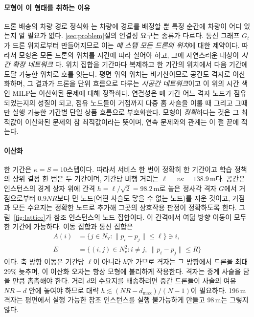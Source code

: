 \documentclass[final,5p,times,twocolumn]{elsarticle}
\begin{document}
\paragraph{모형이 이 형태를 취하는 이유}
드론 배송의 차량 경로 정식화 \cite{murray2015,agatz2018}는 차량에 경로를 배정할 뿐 특정 순간에
차량이 어디 있는지 알 필요가 없다. \ref{sec:problem}절의 연결성 요구는 종류가 다르다. 통신 그래프
$G_t$가 드론 위치로부터 만들어지므로 이는 \emph{매 스텝 모든 드론의 위치}에 대한 제약이다. 따라서
모형은 모든 드론의 위치를 시간에 따라 실어야 하고, 그에 자연스러운 대상이 \emph{시간 확장 네트워크}
\cite{ford1962}다. 위치 집합을 기간마다 복제하고 한 기간의 위치에서 다음 기간에 도달 가능한
위치로 호를 잇는다. 평면 위의 위치는 비가산이므로 공간도 격자로 이산화하며, 그 결과가 드론을 단위
흐름으로 다루는 \emph{시공간 네트워크}이고 이 위의 시간 색인 MILP는 이산화된 문제에 대해 정확하다.
연결성은 매 기간 어느 격자 노드가 점유되었는지의 성질이 되고, 점유 노드들이 거점까지 다중 홉 사슬을
이룰 때 그리고 그때만 실행 가능한 기간별 단일 상품 흐름으로 부호화한다. 모형이 \emph{정확}하다는 것은
그 최적값이 이산화된 문제의 참 최적값이라는 뜻이며, 연속 문제와의 관계는 이 절 끝에 적는다.

\paragraph{이산화}
한 기간은 $\kappa = S = 10$스텝이다. 따라서 서비스 한 번이 정확히 한 기간이고 학습 정책의 상위
결정 한 번은 두 기간이며, 기간당 비행 거리는 $\ell = v\kappa = 138.9$\,m다. 공간은 인스턴스의
경계 상자 위에 간격 $h = \ell/\sqrt{2} = 98.2$\,m로 놓은 정사각 격자 $G$에서 거점으로부터 $0.9NR$보다
먼 노드(어떤 사슬도 닿을 수 없는 노드)를 지운 것이고, 거점과 모든 수요지는 정확한 노드로 추가해
그곳의 상호작용 판정이 정확하도록 한다. 그림~\ref{fig:lattice}가 참조 인스턴스의 노드 집합이다.
이 간격에서 여덟 방향 이동이 모두 한 기간에 가능하다. 이동 집합과 통신 집합은
\begin{align}
A(i) &= \{ j \in N_{\mathrm{v}} : \|p_i - p_j\| \le \ell \} \ni i, \label{eq:moveset}\\
E &= \{ (i,j) \in N_{\mathrm{v}}^2 : i \ne j,\ \|p_i - p_j\| \le R \} \label{eq:commset}
\end{align}
이다. 축 방향 이동은 기간당 $\ell$이 아니라 $h$만 가므로 격자는 그 방향에서 드론을 최대 29\%
늦추며, 이 이산화 오차는 항상 모형에 불리하게 작용한다. 격자는 중계 사슬을 담을 만큼 촘촘해야
한다. 거리 $d$의 수요지를 배송하려면 중간 드론들이 사슬의 여유 $NR - d$ 안에 놓여야 하므로 대략
$h \lesssim (NR - d_{\max})/(N-1)$이 필요하다. 196\,m 격자는 평면에서 실행 가능한 참조 인스턴스를
실행 불가능하게 만들고 98\,m는 그렇지 않다.
\end{document}
